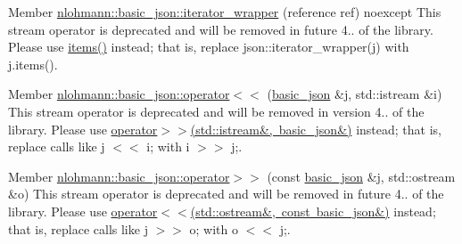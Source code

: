 
\begin{DoxyRefList}
\item[Member \mbox{\hyperlink{classnlohmann_1_1basic__json_ae1130beb16a13c31a623df0448d5c509}{nlohmann::basic\+\_\+json::iterator\+\_\+wrapper}} (reference ref) noexcept]\label{deprecated__deprecated000001}%
%
This stream operator is deprecated and will be removed in future 4.. of the library. Please use \mbox{\hyperlink{classnlohmann_1_1basic__json_a5961446010dfc494e0c247b4e9026977}{items()}} instead; that is, replace {\ttfamily json\+::iterator\+\_\+wrapper(j)} with {\ttfamily j.\+items()}.  
\item[Member \mbox{\hyperlink{classnlohmann_1_1basic__json_ab7285a92514fcdbe6de505ebaba92ea3}{nlohmann::basic\+\_\+json::operator$<$$<$}} (\mbox{\hyperlink{classnlohmann_1_1basic__json}{basic\+\_\+json}} \&j, std\+::istream \&i)]\label{deprecated__deprecated000003}%
%
This stream operator is deprecated and will be removed in version 4.. of the library. Please use \mbox{\hyperlink{classnlohmann_1_1basic__json_aaf363408931d76472ded14017e59c9e8}{operator$>$$>$(std\+::istream\&, basic\+\_\+json\&)}} instead; that is, replace calls like {\ttfamily j $<$$<$ i;} with {\ttfamily i $>$$>$ j;}.  
\item[Member \mbox{\hyperlink{classnlohmann_1_1basic__json_a9e06deabe69262c3ffc5533d32856983}{nlohmann::basic\+\_\+json::operator$>$$>$}} (const \mbox{\hyperlink{classnlohmann_1_1basic__json}{basic\+\_\+json}} \&j, std\+::ostream \&o)]\label{deprecated__deprecated000002}%
%
This stream operator is deprecated and will be removed in future 4.. of the library. Please use \mbox{\hyperlink{classnlohmann_1_1basic__json_a5e34c5435e557d0bf666bd7311211405}{operator$<$$<$(std\+::ostream\&, const basic\+\_\+json\&)}} instead; that is, replace calls like {\ttfamily j $>$$>$ o;} with {\ttfamily o $<$$<$ j;}. 
\end{DoxyRefList}